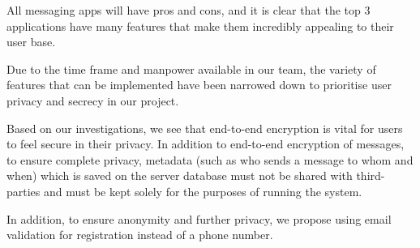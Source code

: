 All messaging apps will have pros and cons, and it is clear that the top 3 applications have many features that make them incredibly appealing to their user base. 

Due to the time frame and manpower available in our team, the variety of features that can be implemented have been narrowed down to prioritise user privacy and secrecy in our project.

Based on our investigations, we see that end-to-end encryption is vital for users to feel secure in their privacy. In addition to end-to-end encryption of messages, to ensure complete privacy, metadata (such as who sends a message to whom and when) which is saved on the server database must not be shared with third-parties and must be kept solely for the purposes of running the system.

In addition, to ensure anonymity and further privacy, we propose using email validation for registration instead of a phone number.